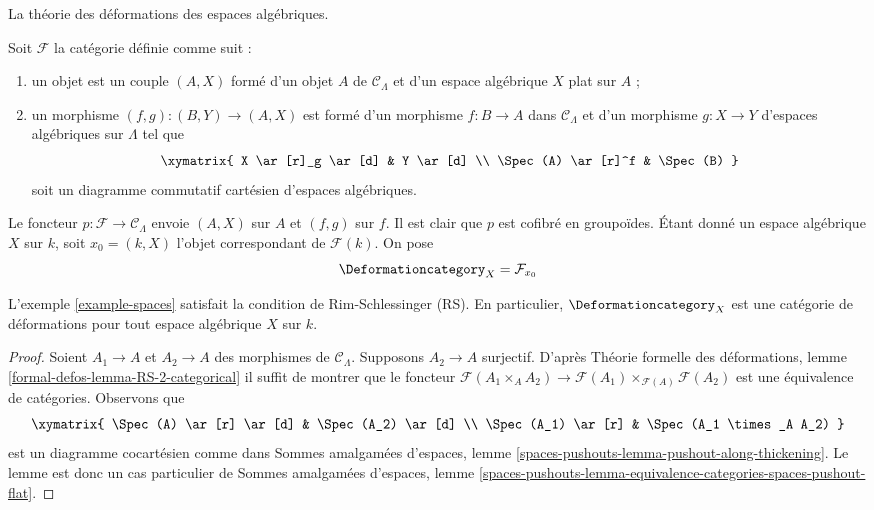 \noindent
La théorie des déformations des espaces algébriques.

\begin{example}
\label{example-spaces}
Soit $\mathcal{F}$ la catégorie définie comme suit :
\begin{enumerate}
\item un objet est un couple $(A, X)$ formé d'un
objet $A$ de $\mathcal{C}_\Lambda$ et d'un espace algébrique
$X$ plat sur $A$ ;
\item un morphisme $(f, g) : (B, Y) \to (A, X)$ est formé d'un
morphisme $f : B \to A$ dans $\mathcal{C}_\Lambda$ et
d'un morphisme $g : X \to Y$ d'espaces algébriques sur $\Lambda$
tel que
$$
\xymatrix{
X \ar[r]_g \ar[d] & Y \ar[d] \\
\Spec(A) \ar[r]^f & \Spec(B)
}
$$
soit un diagramme commutatif cartésien d'espaces algébriques.
\end{enumerate}
Le foncteur $p : \mathcal{F} \to \mathcal{C}_\Lambda$ envoie $(A, X)$
sur $A$ et $(f, g)$ sur $f$. Il est clair que $p$ est cofibré en groupoïdes.
Étant donné un espace algébrique $X$ sur $k$, soit
$x_0 = (k, X)$ l'objet correspondant de $\mathcal{F}(k)$. On pose
$$
\Deformationcategory_X = \mathcal{F}_{x_0}
$$
\end{example}

\begin{lemma}
\label{lemma-spaces-RS}
L'exemple \ref{example-spaces}
satisfait la condition de Rim-Schlessinger (RS).
En particulier, $\Deformationcategory_X$ est une catégorie de déformations
pour tout espace algébrique $X$ sur $k$.
\end{lemma}

\begin{proof}
Soient $A_1 \to A$ et $A_2 \to A$ des morphismes de $\mathcal{C}_\Lambda$.
Supposons $A_2 \to A$ surjectif. D'après Théorie formelle
des déformations, lemme
\ref{formal-defos-lemma-RS-2-categorical}
il suffit de montrer que le foncteur
$\mathcal{F}(A_1 \times_A A_2) \to
\mathcal{F}(A_1) \times_{\mathcal{F}(A)} \mathcal{F}(A_2)$
est une équivalence de catégories.
Observons que
$$
\xymatrix{
\Spec(A) \ar[r] \ar[d] & \Spec(A_2) \ar[d] \\
\Spec(A_1) \ar[r] &
\Spec(A_1 \times_A A_2)
}
$$
est un diagramme cocartésien comme dans Sommes amalgamées d'espaces, lemme
\ref{spaces-pushouts-lemma-pushout-along-thickening}.
Le lemme est donc un cas particulier de Sommes amalgamées d'espaces, lemme
\ref{spaces-pushouts-lemma-equivalence-categories-spaces-pushout-flat}.
\end{proof}

